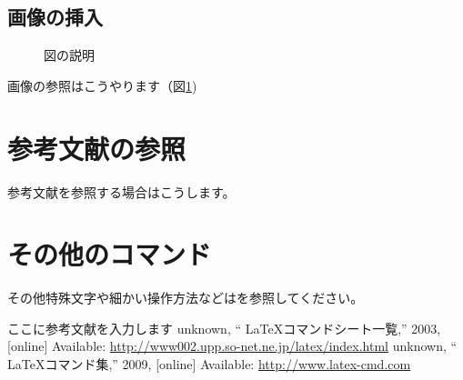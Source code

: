 \documentclass[12pt, b5paper]{ltjsarticle}
\begin{document}
        \subsection{画像の挿入}
            \begin{figure}[H]
                \begin{center}
                \end{center}
                \caption{図の説明}
                \label{fig:sample1}
            \end{figure}
            画像の参照はこうやります（図\ref{fig:sample1})
    \section{参考文献の参照}
        参考文献を参照する場合は\cite{bib1}こうします。
    \section{その他のコマンド}
        その他特殊文字や細かい操作方法などは\cite{sheat1,sheat2}を参照してください。

    \begin{thebibliography}{9}
         ここに参考文献を入力します
         unknown, `` LaTeXコマンドシート一覧,'' 2003, [online] Available: \url{http://www002.upp.so-net.ne.jp/latex/index.html}
         unknown, `` LaTeXコマンド集,'' 2009, [online] Available: \url{http://www.latex-cmd.com}
    \end{thebibliography}
\end{document}

